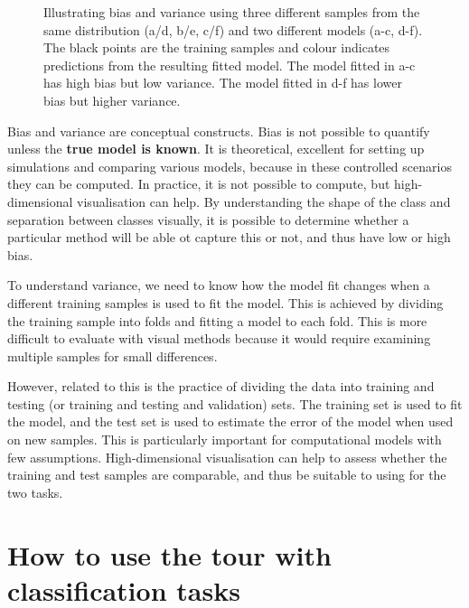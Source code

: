\documentclass[
  letterpaper,
]{krantz}
\begin{document}
\begin{figure}


\caption{\label{fig-bias-variance}Illustrating bias and variance using
three different samples from the same distribution (a/d, b/e, c/f) and
two different models (a-c, d-f). The black points are the training
samples and colour indicates predictions from the resulting fitted
model. The model fitted in a-c has high bias but low variance. The model
fitted in d-f has lower bias but higher variance.}

\end{figure}%

Bias and variance are conceptual constructs. Bias is not possible to
quantify unless the \textbf{true model is known}. It is theoretical,
excellent for setting up simulations and comparing various models,
because in these controlled scenarios they can be computed. In practice,
it is not possible to compute, but high-dimensional visualisation can
help. By understanding the shape of the class and separation between
classes visually, it is possible to determine whether a particular
method will be able ot capture this or not, and thus have low or high
bias.

To understand variance, we need to know how the model fit changes when a
different training samples is used to fit the model. This is achieved by
dividing the training sample into folds and fitting a model to each
fold. This is more difficult to evaluate with visual methods because it
would require examining multiple samples for small differences.

However, related to this is the practice of dividing the data into
training and testing (or training and testing and validation) sets. The
training set is used to fit the model, and the test set is used to
estimate the error of the model when used on new samples. This is
particularly important for computational models with few assumptions.
High-dimensional visualisation can help to assess whether the training
and test samples are comparable, and thus be suitable to using for the
two tasks.

\section{How to use the tour with classification
tasks}\label{how-to-use-the-tour-with-classification-tasks}
\end{document}
